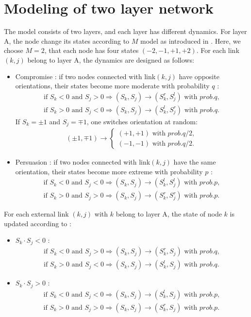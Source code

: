 \section{Modeling of two layer network}
\label{sec:modeling of two layer network}
The model consists of two layers, and each layer has different dynamics. For layer A, the node change its states according to $M$ model as introduced in \cite{rocca2014}. Here, we choose $M=2$, that each node has four states $(-2, -1, +1, +2)$. For each link $(k, j)$ belong to layer A,  the dynamics are designed as follows:
\begin{itemize}
	\item Compromise : if two nodes connected with link$(k, j)$ have opposite orientations, their states become more moderate with probability $q$ :
	\begin{align}
	\mbox{if } S_k<0 \mbox{ and } S_j>0  \Rightarrow (S_k, S_j) \rightarrow (S_k^r, S_j^l) \mbox{ with } prob.q,\\
	\mbox{if } S_k>0 \mbox{ and } S_j<0  \Rightarrow (S_k, S_j) \rightarrow (S_k^l, S_j^r) \mbox{ with } prob.q.
	\end{align}
	If $S_k = \pm1$ and $S_j = \mp1$, one switches orientation at random:
	\begin{align}
	(\pm 1, \mp 1)\rightarrow \left\{\begin{matrix}
	(+1, +1) \mbox{ with } prob.q/2,
	\\(-1, -1)\mbox{ with } prob.q/2.
	\end{matrix}\right.
	\end{align}
	\item Persuasion : if two nodes connected with link$(k, j)$ have the same orientation, their states become more extreme with probability $p$ :
	\begin{align}
	\mbox{if } S_k<0 \mbox{ and } S_j<0  \Rightarrow (S_k, S_j) \rightarrow (S_k^l, S_j^l) \mbox{ with } prob.p,\\
	\mbox{if } S_k>0 \mbox{ and } S_j>0  \Rightarrow (S_k, S_j) \rightarrow (S_k^r, S_j^r) \mbox{ with } prob.p.
	\end{align}
\end{itemize}
For each external link $(k,j)$ with $k$ belong to layer A, the state of node $k$ is updated according to :
\begin{itemize}
	\item $S_k \cdot S_j < 0$ :
	\begin{align}
	\mbox{if } S_k<0 \mbox{ and } S_j>0  \Rightarrow (S_k, S_j) \rightarrow (S_k^r, S_j) \mbox{ with } prob.q,\\
	\mbox{if } S_k>0 \mbox{ and } S_j<0  \Rightarrow (S_k, S_j) \rightarrow (S_k^l, S_j) \mbox{ with } prob.q.
	\end{align}
	\item $S_k \cdot S_j > 0$ :
	\begin{align}
	\mbox{if } S_k<0 \mbox{ and } S_j<0  \Rightarrow (S_k, S_j) \rightarrow (S_k^l, S_j) \mbox{ with } prob.p,\\
	\mbox{if } S_k>0 \mbox{ and } S_j>0  \Rightarrow (S_k, S_j) \rightarrow (S_k^r, S_j) \mbox{ with } prob.p.
	\end{align}
\end{itemize}
